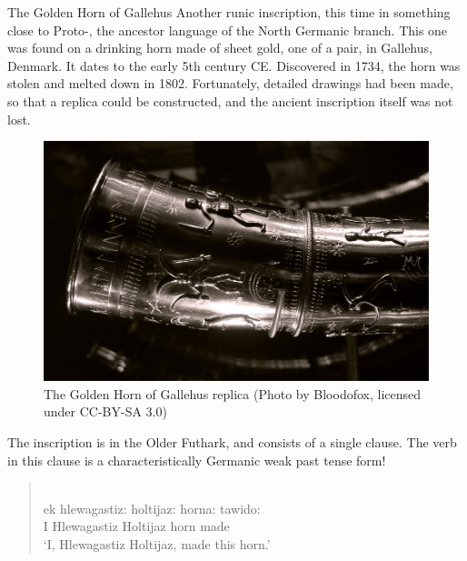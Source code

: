 \begin{texts}{The Golden Horn of Gallehus}
Another runic inscription, this time in something close to Proto-, the ancestor language of the North Germanic branch. This one was found on a drinking horn made of sheet gold, one of a pair, in Gallehus, Denmark. It dates to the early 5th century CE. Discovered in 1734, the horn was stolen and melted down in 1802. Fortunately, detailed drawings had been made, so that a replica could be constructed, and the ancient inscription itself was not lost.


\begin{figure}[H]
        \includegraphics[height=0.2\textheight]{chapters/img/horn_of_gallehus.png}
    \caption{The Golden Horn of Gallehus replica (Photo by Bloodofox, licensed under CC-BY-SA 3.0)}
    \label{fig:horn-of-hallehus}
\end{figure}


\noindent The inscription is in the Older Futhark, and consists of a single clause. The verb in this clause is a characteristically Germanic weak past tense form!


\begin{quote}
    \\
    \gll ek hlewagastiz: holtijaz: horna: tawido:\\
    I Hlewagastiz Holtijaz horn made\\\newline
    \trans `I, Hlewagastiz Holtijaz, made this horn.'
\end{quote}

\end{texts}
